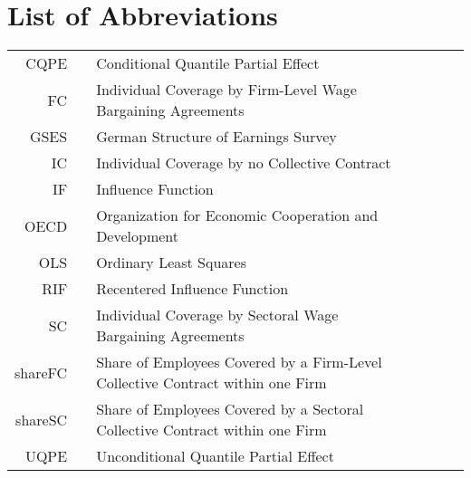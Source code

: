 \section*{List of Abbreviations}

\begin{tabular}{rp{0.2cm}lp{1cm}rp{0.2cm}l}
  CQPE      & & Conditional Quantile Partial Effect   & &    & &\\
  FC      & & Individual Coverage by Firm-Level Wage Bargaining Agreements  & &    & &\\
  GSES   & & German Structure of Earnings Survey   & &    & &\\
  IC      & & Individual Coverage by no Collective Contract   & &    & &\\
  IF      & & Influence Function   & &    & &\\
  OECD  & & Organization for Economic Cooperation and Development   & &    & &   \\
  OLS  & & Ordinary Least Squares   & &    & &   \\
  RIF      & & Recentered Influence Function   & &    & &\\
  SC      & & Individual Coverage by Sectoral Wage Bargaining Agreements   & &    & &\\
  shareFC      & & Share of Employees Covered by a Firm-Level Collective Contract within one Firm   & &    & &\\
  shareSC      & & Share of Employees Covered by a Sectoral Collective Contract within one Firm   & &    & &\\
  UQPE      & & Unconditional Quantile Partial Effect   & &    & &\\
\end{tabular}